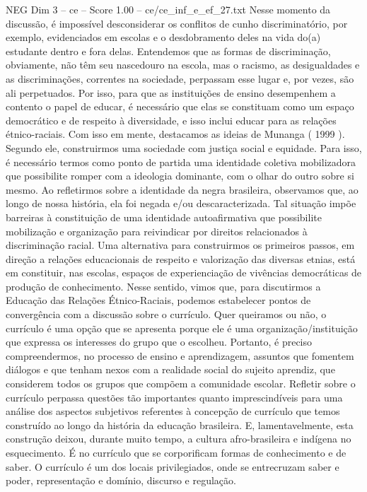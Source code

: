 \begin{textsample}{NEG Dim 3 – ce – Score 1.00 – ce/ce\_inf\_e\_ef\_27.txt}
Nesse momento da discussão, é impossível desconsiderar os conflitos de cunho discriminatório, por exemplo, evidenciados em escolas e o desdobramento deles na vida do(a) estudante dentro e fora delas.
Entendemos que as formas de discriminação, obviamente, não têm seu nascedouro na escola, mas o racismo, as desigualdades e as discriminações, correntes na sociedade, perpassam esse lugar e, por vezes, são ali perpetuados.
Por isso, para que as instituições de ensino desempenhem a contento o papel de educar, é necessário que elas se constituam como um espaço democrático e de respeito à diversidade, e isso inclui educar para as relações étnico-raciais.
Com isso em mente, destacamos as ideias de Munanga ( 1999 ).
Segundo ele, construirmos uma sociedade com justiça social e equidade.
Para isso, é necessário termos como ponto de partida uma identidade coletiva mobilizadora que possibilite romper com a ideologia dominante, com o olhar do outro sobre si mesmo.
Ao refletirmos sobre a identidade da negra brasileira, observamos que, ao longo de nossa história, ela foi negada e/ou descaracterizada.
Tal situação impõe barreiras à constituição de uma identidade autoafirmativa que possibilite mobilização e organização para reivindicar por direitos relacionados à discriminação racial.
Uma alternativa para construirmos os primeiros passos, em direção a relações educacionais de respeito e valorização das diversas etnias, está em constituir, nas escolas, espaços de experienciação de vivências democráticas de produção de conhecimento.
Nesse sentido, vimos que, para discutirmos a Educação das Relações Étnico-Raciais, podemos estabelecer pontos de convergência com a discussão sobre o currículo.
Quer queiramos ou não, o currículo é uma opção que se apresenta porque ele é uma organização/instituição que expressa os interesses do grupo que o escolheu.
Portanto, é preciso compreendermos, no processo de ensino e aprendizagem, assuntos que fomentem diálogos e que tenham nexos com a realidade social do sujeito aprendiz, que considerem todos os grupos que compõem a comunidade escolar.
Refletir sobre o currículo perpassa questões tão importantes quanto imprescindíveis para uma análise dos aspectos subjetivos referentes à concepção de currículo que temos construído ao longo da história da educação brasileira.
E, lamentavelmente, esta construção deixou, durante muito tempo, a cultura afro-brasileira e indígena no esquecimento.
É no currículo que se corporificam formas de conhecimento e de saber.
O currículo é um dos locais privilegiados, onde se entrecruzam saber e poder, representação e domínio, discurso e regulação.

\end{textsample}
